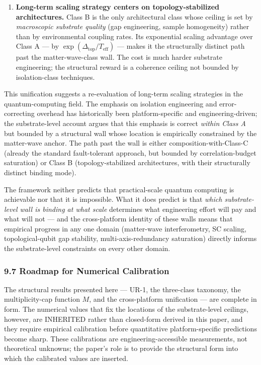 \documentclass[
  11pt,
  a4paper,
]{article}
\begin{document}
\begin{enumerate}
  substrate-level bounds simultaneously must include a Class B
  subsystem, since Class A and Class C alone cannot.
\item
  \textbf{Long-term scaling strategy centers on topology-stabilized
  architectures.} Class B is the only architectural class whose ceiling
  is set by \emph{macroscopic substrate quality} (gap engineering,
  sample homogeneity) rather than by environmental coupling rates. Its
  exponential scaling advantage over Class A --- by
  \(\exp(\Delta_{\mathrm{top}}/T_{\mathrm{eff}})\) --- makes it the
  structurally distinct path past the matter-wave-class wall. The cost
  is much harder substrate engineering; the structural reward is a
  coherence ceiling not bounded by isolation-class techniques.
\end{enumerate}

This unification suggests a re-evaluation of long-term scaling
strategies in the quantum-computing field. The emphasis on isolation
engineering and error-correcting overhead has historically been
platform-specific and engineering-driven; the substrate-level account
argues that this emphasis is correct \emph{within Class A} but bounded
by a structural wall whose location is empirically constrained by the
matter-wave anchor. The path past the wall is either
composition-with-Class-C (already the standard fault-tolerant approach,
but bounded by correlation-budget saturation) or Class B
(topology-stabilized architectures, with their structurally distinct
binding mode).

The framework neither predicts that practical-scale quantum computing is
achievable nor that it is impossible. What it does predict is that
\emph{which substrate-level wall is binding at what scale} determines
what engineering effort will pay and what will not --- and the
cross-platform identity of these walls means that empirical progress in
any one domain (matter-wave interferometry, SC scaling,
topological-qubit gap stability, multi-axis-redundancy saturation)
directly informs the substrate-level constraints on every other domain.

\subsubsection{9.7 Roadmap for Numerical
Calibration}\label{roadmap-for-numerical-calibration}

The structural results presented here --- UR-1, the three-class
taxonomy, the multiplicity-cap function \(M\), and the cross-platform
unification --- are complete in form. The numerical values that fix the
locations of the substrate-level ceilings, however, are INHERITED rather
than closed-form derived in this paper, and they require empirical
calibration before quantitative platform-specific predictions become
sharp. These calibrations are engineering-accessible measurements, not
theoretical unknowns; the paper's role is to provide the structural form
into which the calibrated values are inserted.
\end{document}
